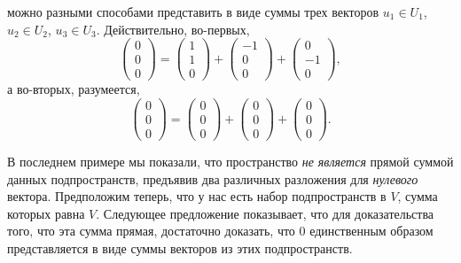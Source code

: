 \begin{examples}
\begin{enumerate}
можно разными способами представить в виде суммы трех векторов $u_1\in U_1$,
$u_2\in U_2$, $u_3\in U_3$. Действительно,
во-первых,
$$
\begin{pmatrix} 0 \\ 0 \\ 0\end{pmatrix}
=
\begin{pmatrix} 1 \\ 1 \\ 0\end{pmatrix} +
\begin{pmatrix} -1 \\ 0 \\ 0\end{pmatrix} +
\begin{pmatrix} 0 \\ -1 \\ 0\end{pmatrix},
$$
а во-вторых, разумеется,
$$
\begin{pmatrix} 0 \\ 0 \\ 0\end{pmatrix}
=
\begin{pmatrix} 0 \\ 0 \\ 0\end{pmatrix} +
\begin{pmatrix} 0 \\ 0 \\ 0\end{pmatrix} +
\begin{pmatrix} 0 \\ 0 \\ 0\end{pmatrix}.
$$
\end{enumerate}
\end{examples}

В последнем примере мы показали, что пространство {\em не является}
прямой суммой данных подпространств, предъявив два различных разложения
для {\em нулевого} вектора. Предположим теперь, что у нас есть набор
подпространств в $V$, сумма которых равна $V$. Следующее предложение
показывает, что для доказательства того, что эта сумма прямая,
достаточно доказать, что $0$ единственным образом представляется
в виде суммы векторов из этих подпространств.

